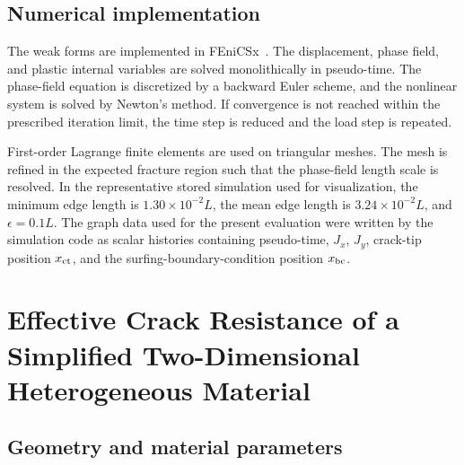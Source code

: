 \documentclass[pdflatex,sn-mathphys-num]{sn-jnl}
\begin{document}
\subsection{Numerical implementation}\label{sec:numerical_implementation}

The weak forms are implemented in FEniCSx~\cite{_fenicsx_}. The displacement, phase field, and plastic internal variables are solved monolithically in pseudo-time. The phase-field equation is discretized by a backward Euler scheme, and the nonlinear system is solved by Newton's method. If convergence is not reached within the prescribed iteration limit, the time step is reduced and the load step is repeated.

First-order Lagrange finite elements are used on triangular meshes. The mesh is refined in the expected fracture region such that the phase-field length scale is resolved. In the representative stored simulation used for visualization, the minimum edge length is \(1.30\times 10^{-2}L\), the mean edge length is \(3.24\times 10^{-2}L\), and \(\epsilon=0.1L\). The graph data used for the present evaluation were written by the simulation code as scalar histories containing pseudo-time, \(J_x\), \(J_y\), crack-tip position \(x_{\rm ct}\), and the surfing-boundary-condition position \(x_{\rm bc}\).

\section{Effective Crack Resistance of a Simplified Two-Dimensional Heterogeneous Material}\label{sec:2Dresults}

\subsection{Geometry and material parameters}\label{sec:geometry}
\end{document}
